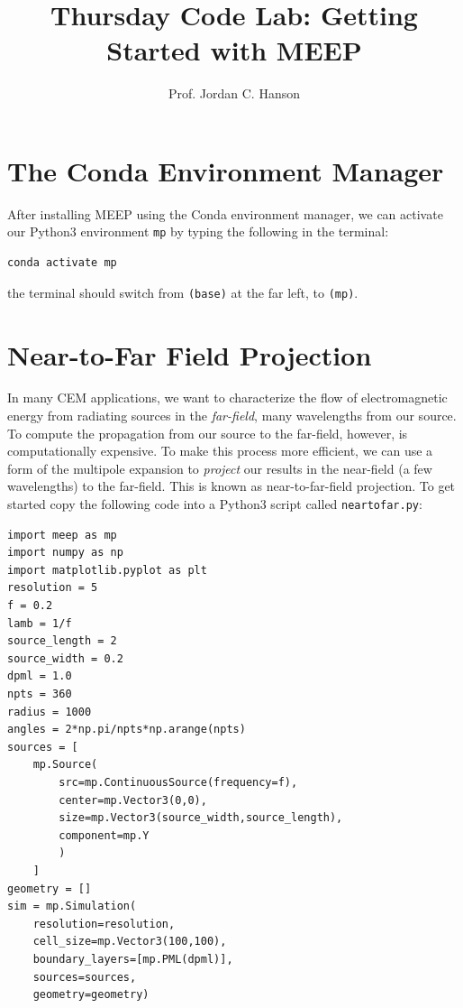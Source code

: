 \documentclass[10pt]{article}
\begin{document}
\twocolumn
\small

\title{Thursday Code Lab: Getting Started with MEEP}
\author{Prof. Jordan C. Hanson}

\maketitle

\section{The Conda Environment Manager}

After installing MEEP using the Conda environment manager, we can activate our Python3 environment \verb+mp+ by typing the following in the terminal:
\begin{verbatim}
conda activate mp
\end{verbatim}
\noindent
the terminal should switch from \verb+(base)+ at the far left, to \verb+(mp)+.

\section{Near-to-Far Field Projection}

In many CEM applications, we want to characterize the flow of electromagnetic energy from radiating sources in the \textit{far-field}, many wavelengths from our source.  To compute the propagation from our source to the far-field, however, is computationally expensive.  To make this process more efficient, we can use a form of the multipole expansion to \textit{project} our results in the near-field (a few wavelengths) to the far-field.  This is known as near-to-far-field projection.  To get started copy the following code into a Python3 script called \verb+neartofar.py+:

\begin{verbatim}
import meep as mp
import numpy as np
import matplotlib.pyplot as plt
resolution = 5
f = 0.2
lamb = 1/f
source_length = 2
source_width = 0.2
dpml = 1.0
npts = 360
radius = 1000
angles = 2*np.pi/npts*np.arange(npts)
sources = [
    mp.Source(
        src=mp.ContinuousSource(frequency=f),
        center=mp.Vector3(0,0),
        size=mp.Vector3(source_width,source_length),
        component=mp.Y
        )
    ]
geometry = []
sim = mp.Simulation(
    resolution=resolution,
    cell_size=mp.Vector3(100,100),
    boundary_layers=[mp.PML(dpml)],
    sources=sources,
    geometry=geometry)
\end{verbatim}
\end{document}

